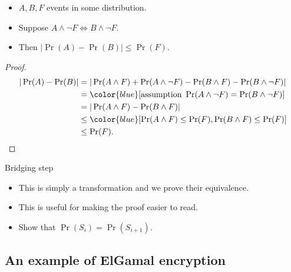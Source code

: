 \begin{frame}
  \begin{lemma}
    \begin{itemize}
      \item \(A, B, F\) events in some distribution.
      \item Suppose \(A\land \lnot F\iff B\land \lnot F\).
      \item Then \(|\Pr(A) - \Pr(B)|\leq \Pr(F)\).
    \end{itemize}
  \end{lemma}
\end{frame}

\begin{frame}
  \begin{proof}
    \small
    \begin{align*}
      |\Pr(A) - \Pr(B)|
      &= |\Pr(A\land F) + \Pr(A\land \lnot F)
      - \Pr(B\land F) - \Pr(B\land \lnot F)| \\
      &= \color{blue} [\text{assumption } \Pr(A\land\lnot F) = \Pr(B\land\lnot 
      F)] \\
      &= |\Pr(A\land F) - \Pr(B\land F)| \\
      &\leq \color{blue} [ \Pr(A\land F)\leq \Pr(F), \Pr(B\land F)\leq \Pr(F) 
      ] \\
      &\leq \Pr(F).
    \end{align*}
  \end{proof}
\end{frame}

\begin{frame}
  \begin{block}{Bridging step}
    \begin{itemize}
      \item This is simply a transformation and we prove their equivalence.
      \item This is useful for making the proof easier to read.

        \pause{}

      \item \color{red} Show that \(\Pr(S_i) = \Pr(S_{i+1})\).
    \end{itemize}
  \end{block}
\end{frame}

\subsection{An example of ElGamal encryption}

